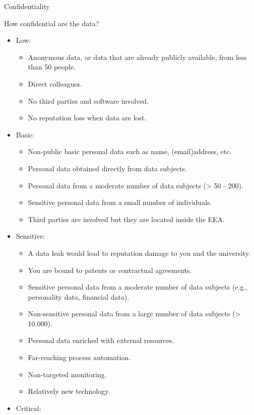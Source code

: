 \documentclass[
]{book}
\providecommand{\tightlist}{%
  \setlength{\itemsep}{0pt}\setlength{\parskip}{0pt}}
\begin{document}
Confidentiality

How confidential are the data?

\begin{itemize}
\tightlist
\item
  Low:

  \begin{itemize}
  \tightlist
  \item
    Anonymous data, or data that are already publicly available, from less than
    50 people.
  \item
    Direct colleagues.
  \item
    No third parties and software involved.
  \item
    No reputation loss when data are lost.
  \end{itemize}
\item
  Basic:

  \begin{itemize}
  \tightlist
  \item
    Non-public basic personal data such as name, (email)address, etc.
  \item
    Personal data obtained directly from data subjects.
  \item
    Personal data from a moderate number of data subjects (\textgreater{} 50 - 200).
  \item
    Sensitive personal data from a small number of individuals.
  \item
    Third parties are involved but they are located inside the EEA.
  \end{itemize}
\item
  Sensitive:

  \begin{itemize}
  \tightlist
  \item
    A data leak would lead to reputation damage to you and the university.
  \item
    You are bound to patents or contractual agreements.
  \item
    Sensitive personal data from a moderate number of data subjects (e.g.,
    personality data, financial data).
  \item
    Non-sensitive personal data from a large number of data subjects (\textgreater{} 10.000).
  \item
    Personal data enriched with external resources.
  \item
    Far-reaching process automation.
  \item
    Non-targeted monitoring.
  \item
    Relatively new technology.
  \end{itemize}
\item
  Critical:


\end{itemize}
\end{document}
